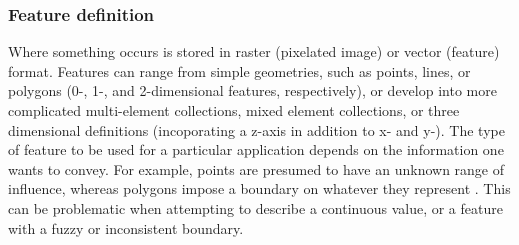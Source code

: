 
\subsubsection{Feature definition}
Where something occurs is stored in raster (pixelated image) or vector (feature) format. Features can range from simple geometries, such as points, lines, or polygons (0-, 1-, and 2-dimensional features, respectively), or develop into more complicated multi-element collections, mixed element collections, or three dimensional definitions (incoporating a z-axis in addition to x- and y-). The type of feature to be used for a particular application depends on the information one wants to convey. For example, points are presumed to have an unknown range of influence, whereas polygons impose a boundary on whatever they represent \cite{Brown2012}. This can be problematic when attempting to describe a continuous value, or a feature with a fuzzy or inconsistent boundary. %
